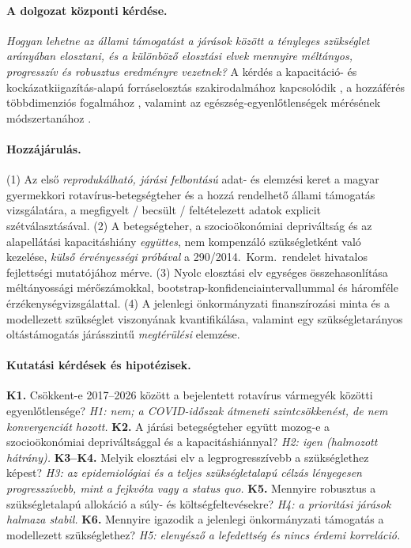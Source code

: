 \documentclass[11pt,a4paper]{article}
\begin{document}
\paragraph{A dolgozat központi kérdése.}
\emph{Hogyan lehetne az állami támogatást a járások között a tényleges
szükséglet arányában elosztani, és a különböző elosztási elvek mennyire
méltányos, progresszív és robusztus eredményre vezetnek?} A kérdés a
kapacitáció- és kockázatkiigazítás-alapú forráselosztás szakirodalmához
kapcsolódik \citep{rice2001}, a hozzáférés több\-dimenziós fogalmához
\citep{penchansky1981}, valamint az egészség-egyenlőtlenségek mérésének
módszertanához \citep{wagstaff1991,odonnell2008,kakwani1977}.

\paragraph{Hozzájárulás.}
(1) Az első \emph{reprodukálható, járási felbontású} adat- és elemzési keret a
magyar gyermekkori rotavírus-betegségteher és a hozzá rendelhető állami
támogatás vizsgálatára, a megfigyelt / becsült / feltételezett adatok
explicit szétválasztásával. (2) A betegségteher, a szocioökonómiai
depriváltság és az alapellátási kapacitáshiány \emph{együttes}, nem
kompenzáló szükségletként való kezelése, \emph{külső érvényességi próbával} a
290/2014.\ Korm.\ rendelet hivatalos fejlettségi mutatójához mérve. (3) Nyolc
elosztási elv egységes összehasonlítása méltányossági mérőszámokkal,
bootstrap-konfidenciaintervallummal és háromféle érzékenységvizsgálattal.
(4) A jelenlegi önkormányzati finanszírozási minta és a modellezett
szükséglet viszonyának kvantifikálása, valamint egy szükségletarányos
oltástámogatás járásszintű \emph{megtérülési} elemzése.

\paragraph{Kutatási kérdések és hipotézisek.}
\textbf{K1.} Csökkent-e 2017--2026 között a bejelentett rotavírus vármegyék
közötti egyenlőtlensége? \emph{H1: nem; a COVID-időszak átmeneti
szintcsökkenést, de nem konvergenciát hozott.}
\textbf{K2.} A járási betegségteher együtt mozog-e a szocioökonómiai
depriváltsággal és a kapacitáshiánnyal? \emph{H2: igen (halmozott hátrány).}
\textbf{K3--K4.} Melyik elosztási elv a legprogresszívebb a szükséglethez
képest? \emph{H3: az epidemiológiai és a teljes szükségletalapú célzás
lényegesen progresszívebb, mint a fejkvóta vagy a status quo.}
\textbf{K5.} Mennyire robusztus a szükségletalapú allokáció a súly- és
költségfeltevésekre? \emph{H4: a prioritási járások halmaza stabil.}
\textbf{K6.} Mennyire igazodik a jelenlegi önkormányzati támogatás a
modellezett szükséglethez? \emph{H5: elenyésző a lefedettség és nincs érdemi
korreláció.}
\end{document}
